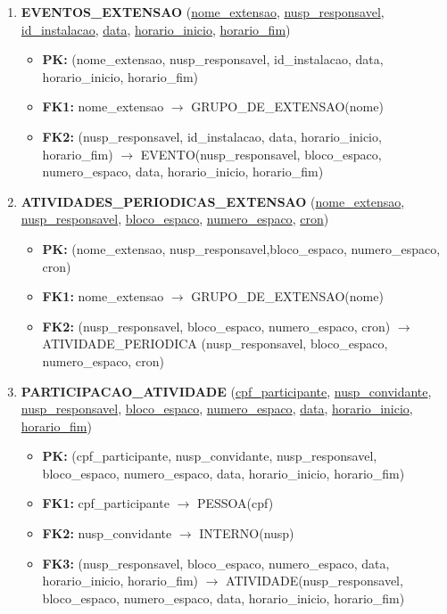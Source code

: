 \documentclass{article}
\begin{document}
\begin{enumerate}
    \item \textbf{EVENTOS\_EXTENSAO} (\underline{nome\_extensao}, \underline{nusp\_responsavel}, \underline{id\_instalacao}, \underline{data}, \underline{horario\_inicio}, \underline{horario\_fim})
        \begin{itemize}
            \item \textbf{PK:} (nome\_extensao, nusp\_responsavel, id\_instalacao, data, horario\_inicio, horario\_fim)
            \item \textbf{FK1:} nome\_extensao $\rightarrow$ GRUPO\_DE\_EXTENSAO(nome)
            \item \textbf{FK2:} (nusp\_responsavel, id\_instalacao, data, horario\_inicio, horario\_fim) $\rightarrow$ EVENTO(nusp\_responsavel, bloco\_espaco, numero\_espaco, data, horario\_inicio, horario\_fim)
        \end{itemize}
        
    \item \textbf{ATIVIDADES\_PERIODICAS\_EXTENSAO} (\underline{nome\_extensao}, \underline{nusp\_responsavel}, \underline{bloco\_espaco}, \underline{numero\_espaco}, \underline{cron})
        \begin{itemize}
            \item \textbf{PK:} (nome\_extensao, nusp\_responsavel,bloco\_espaco, numero\_espaco, cron)
            \item \textbf{FK1:} nome\_extensao $\rightarrow$ GRUPO\_DE\_EXTENSAO(nome)
            \item \textbf{FK2:} (nusp\_responsavel, bloco\_espaco, numero\_espaco, cron) $\rightarrow$ ATIVIDADE\_PERIODICA (nusp\_responsavel, bloco\_espaco, numero\_espaco, cron)
        \end{itemize}

    \item \textbf{PARTICIPACAO\_ATIVIDADE} (\underline{cpf\_participante}, \underline{nusp\_convidante}, \underline{nusp\_responsavel}, \underline{bloco\_espaco}, \underline{numero\_espaco}, \underline{data}, \underline{horario\_inicio}, \underline{horario\_fim})
        \begin{itemize}
            \item \textbf{PK:} (cpf\_participante, nusp\_convidante, nusp\_responsavel, bloco\_espaco, numero\_espaco, data, horario\_inicio, horario\_fim)
            \item \textbf{FK1:} cpf\_participante $\rightarrow$ PESSOA(cpf)
            \item \textbf{FK2:} nusp\_convidante $\rightarrow$ INTERNO(nusp)
            \item \textbf{FK3:} (nusp\_responsavel, bloco\_espaco, numero\_espaco, data, horario\_inicio, horario\_fim) $\rightarrow$ ATIVIDADE(nusp\_responsavel, bloco\_espaco, numero\_espaco, data, horario\_inicio, horario\_fim)
        \end{itemize}


\end{enumerate}
\end{document}
